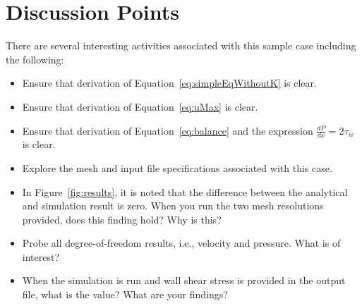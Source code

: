 \documentclass{article}
\begin{document}
\section{Discussion Points}

There are several interesting activities associated with this sample case including
the following:

\begin{itemize}
	\item Ensure that derivation of Equation~\ref{eq:simpleEqWithoutK} is clear.
	\item Ensure that derivation of Equation~\ref{eq:uMax} is clear.
	\item Ensure that derivation of Equation~\ref{eq:balance} and the expression
           $\frac{dP}{dx} = 2\tau_w$ is clear.
	\item Explore the mesh and input file specifications associated with this case.
	\item In Figure~\ref{fig:results}, it is noted that the difference between
          the analytical and simulation result is zero. When you run the two mesh resolutions provided, 
          does this finding hold? Why is this?
        \item Probe all degree-of-freedom results, i.e., velocity and pressure. What is of interest?
        \item When the simulation is run and wall shear stress is provided in the output file,
          what is the value? What are your findings?
\end{itemize}
\end{document}
